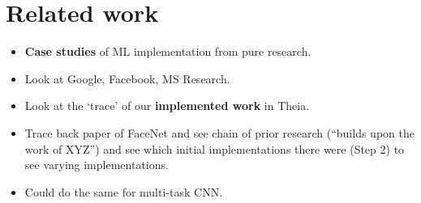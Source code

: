 \section{Related work}

\begin{itemize}
  \item \textbf{Case studies} of ML implementation from pure research.
  \item Look at Google, Facebook, MS Research.
  \item Look at the `trace' of our \textbf{implemented work} in Theia.
  \item Trace back paper of FaceNet and see chain of prior research (``builds upon the work of XYZ'') and see which initial implementations there were (Step 2) to see varying implementations.
  \item Could do the same for multi-task CNN.
\end{itemize}